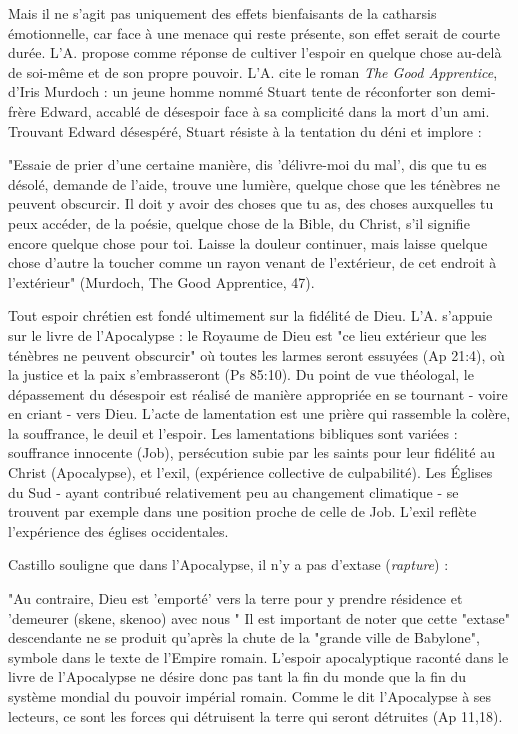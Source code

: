 Mais il ne s'agit pas uniquement des effets bienfaisants de la catharsis émotionnelle, car face à une menace qui reste présente, son effet serait de courte durée. L'A. propose comme réponse de cultiver l'espoir en quelque chose au-delà de soi-même et de son propre pouvoir.
L'A. cite le roman \textit{The Good Apprentice}, d'Iris Murdoch : un jeune homme nommé Stuart tente de réconforter son demi-frère Edward,  accablé de désespoir face à sa complicité dans la mort d'un ami. Trouvant Edward désespéré, Stuart résiste à la tentation du déni et implore :
\begin{singlequote}
    "Essaie de prier d'une certaine manière, dis 'délivre-moi du mal', dis que tu es désolé, demande de l'aide, trouve une lumière, quelque chose que les ténèbres ne peuvent obscurcir. Il doit y avoir des choses que tu as, des choses auxquelles tu peux accéder, de la poésie, quelque chose de la Bible, du Christ, s'il signifie encore quelque chose pour toi. Laisse la douleur continuer, mais laisse quelque chose d'autre la toucher comme un rayon venant de l'extérieur, de cet endroit à l'extérieur" (Murdoch, The Good Apprentice, 47).
\end{singlequote}
 

Tout espoir chrétien est fondé ultimement sur la fidélité de Dieu. L'A. s'appuie sur le livre de l'Apocalypse : le Royaume de Dieu est "ce lieu extérieur que les ténèbres ne peuvent obscurcir" où toutes les larmes seront essuyées (Ap 21:4), où la justice et la paix s'embrasseront (Ps 85:10). Du point de vue théologal, le dépassement du désespoir est réalisé de manière appropriée en se tournant - voire en criant - vers Dieu. L'acte de lamentation est une prière qui rassemble la colère, la souffrance, le deuil et l'espoir. 
Les lamentations bibliques sont variées : souffrance innocente (Job),  persécution subie par les saints pour leur fidélité au Christ (Apocalypse),  et l'exil, (expérience collective de culpabilité). Les Églises du Sud - ayant contribué relativement peu au changement climatique - se trouvent par exemple dans une position proche de celle de Job. L'exil reflète l'expérience des églises occidentales. 

Castillo souligne que dans l'Apocalypse, il n'y a pas d'extase (\textit{rapture}) : 
\begin{singlequote}
     "Au contraire, Dieu est 'emporté' vers la terre pour y prendre résidence et 'demeurer (skene, skenoo) avec nous \cite{rossing_rapture_2005}" Il est important de noter que cette "extase" descendante ne se produit qu'après la chute de la "grande ville de Babylone", symbole dans le texte de l'Empire romain. L'espoir apocalyptique raconté dans le livre de l'Apocalypse ne désire donc pas tant la fin du monde que la fin du système mondial du pouvoir impérial romain. Comme le dit l'Apocalypse à ses lecteurs, ce sont les forces qui détruisent la terre qui seront détruites (Ap 11,18). \cite[p. 161] {cavanaugh_between_2018}
\end{singlequote}

